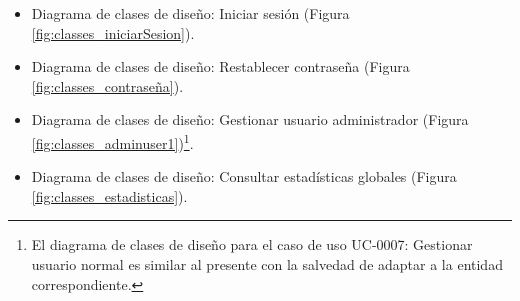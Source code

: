 \documentclass[12pt,a4paper, twoside]{report}
\begin{document}
\begin{itemize}
		\newpage
		
		\item Diagrama de clases de diseño: Iniciar sesión (Figura \ref{fig:classes_iniciarSesion}).
		
		
		\item Diagrama de clases de diseño: Restablecer contraseña (Figura \ref{fig:classes_contraseña}).

		
		\newpage
		
		\item Diagrama de clases de diseño: Gestionar usuario administrador (Figura \ref{fig:classes_adminuser1})\footnote{El diagrama de clases de diseño para el caso de uso UC-0007: Gestionar usuario normal es similar al presente con la salvedad de adaptar a la entidad correspondiente.}.
		 
				
		\newpage
		
		\item Diagrama de clases de diseño: Consultar estadísticas globales (Figura \ref{fig:classes_estadisticas}).
		

\end{itemize}
\end{document}
